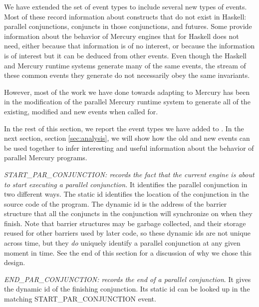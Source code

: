 
We have extended the set of \tscope event types
to include several new types of events.
Most of these record information about constructs that do not exist in Haskell:
parallel conjunctions, conjuncts in those conjunctions, and futures.
Some provide information about the behavior of Mercury engines
that \tscope for Haskell does not need,
either because that information is of no interest,
or because the information is of interest
but it can be deduced from other events.
Even though the Haskell and Mercury runtime systems
generate many of the same events,
the stream of these common events they generate
do not necessarily obey the same invariants.

However, most of the work we have done towards adapting \tscope to Mercury
has been in the modification of the parallel Mercury runtime system
to generate all of the existing, modified and new events when called for.

In the rest of this section,
we report the event types we have added to \tscope.
In the next section, section \ref{sec:analysis},
we will show how the old and new events can be used together
to infer interesting and useful information
about the behavior of parallel Mercury programs.


\emph{START\_PAR\_CONJUNCTION: records the fact that
the current engine is about to start executing a parallel conjunction.}
It identifies the parallel conjunction in two different ways.
The static id identifies
the location of the conjunction in the source code of the program.
The dynamic id is the address of the barrier structure
that all the conjuncts in the conjunction will synchronize on when they finish.
Note that barrier structures may be garbage collected,
and their storage reused for other barriers used by later code,
so these dynamic ids are not unique across time,
but they \emph{do} uniquely identify a parallel conjunction
at any given moment in time.
See the end of this section for a discussion of why we chose this design.

\emph{END\_PAR\_CONJUNCTION:
records the end of a parallel conjunction}.
It gives the dynamic id of the finishing conjunction.
Its static id can be looked up in the matching START\_PAR\_CONJUNCTION event.

